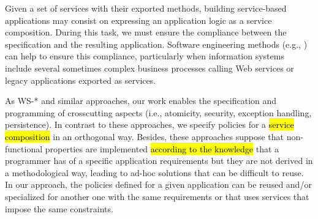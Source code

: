 \documentclass{singlecol-new}
\theoremstyle{TH}{
\newtheorem{lemma}{Lemma}
\newtheorem{theorem}[lemma]{Theorem}
\newtheorem{corrolary}[lemma]{Corrolary}
\newtheorem{conjecture}[lemma]{Conjecture}
\newtheorem{proposition}[lemma]{Proposition}
\newtheorem{claim}[lemma]{Claim}
\newtheorem{stheorem}[lemma]{Wrong Theorem}
\newtheorem{algorithm}{Algorithm}
}
\theoremstyle{THrm}{
\newtheorem{definition}{Definition}[section]
\newtheorem{question}{Question}[section]
\newtheorem{remark}{Remark}
\newtheorem{scheme}{Scheme}
}
\theoremstyle{THhit}{
\newtheorem{case}{Case}[section]
}
\theoremstyle{THhsl}{
\newtheorem{example}{Example}
}
\begin{document}
Given a set of services with their exported methods, building service-based applications may consist on expressing an application logic as a service composition.
During this task, we must ensure the compliance between the specification and the resulting application.
Software engineering methods (e.g., \cite{2,decastro1,PapazoglouH06}) can help to ensure this compliance, particularly when information systems include several sometimes complex business processes calling Web services or legacy applications exported as services.

As WS-* and similar approaches, our work enables the specification and programming of crosscutting aspects (i.e., atomicity, security, exception handling, persistence).
In contrast to these approaches, we specify policies for a \hl{service composition} in an orthogonal way. Besides, these approaches suppose that non-functional properties are implemented \hl{according to the knowledge} that a programmer has of a specific application requirements but they are not derived in a methodological way, leading to ad-hoc solutions that can be difficult to reuse. In our approach,  the policies defined for a given application  can be reused and/or specialized for another one with the same requirements or that uses services that impose the same constraints. 
\end{document}
